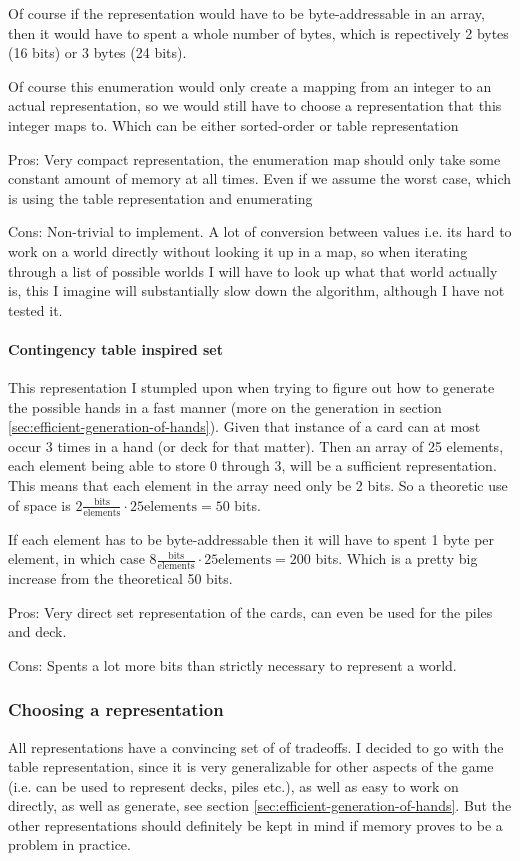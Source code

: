Of course if the representation would have to be byte-addressable in an array, then it would have to spent a whole number of bytes, which is repectively 2 bytes (16 bits) or 3 bytes (24 bits).

Of course this enumeration would only create a mapping from an integer to an actual representation, so we would still have to choose a representation that this integer maps to. Which can be either sorted-order or table representation

Pros: Very compact representation, the enumeration map should only take some constant amount of memory at all times. Even if we assume the worst case, which is using the table representation and enumerating

Cons: Non-trivial to implement. A lot of conversion between values i.e. its hard to work on a world directly without looking it up in a map, so when iterating through a list of possible worlds I will have to look up what that world actually is, this I imagine will substantially slow down the algorithm, although I have not tested it.

\paragraph{Contingency table inspired set}
This representation I stumpled upon when trying to figure out how to generate the possible hands in a fast manner (more on the generation in section \ref{sec:efficient-generation-of-hands}).
Given that instance of a card can at most occur 3 times in a hand (or deck for that matter). Then an array of 25 elements, each element being able to store 0 through 3, will be a sufficient representation. This means that each element in the array need only be 2 bits. So a theoretic use of space is $2 \frac{\text{bits}}{\text{elements}} \cdot 25\text{elements} = 50$ bits. 

If each element has to be byte-addressable then it will have to spent 1 byte per element, in which case $8 \frac{\text{bits}}{\text{elements}} \cdot 25\text{elements} = 200$ bits. Which is a pretty big increase from the theoretical 50 bits.  

Pros: Very direct set representation of the cards, can even be used for the piles and deck. 

Cons: Spents a lot more bits than strictly necessary to represent a world.


\subsubsection{Choosing a representation}
All representations have a convincing set of of tradeoffs. I decided to go with the table representation, since it is very generalizable for other aspects of the game (i.e. can be used to represent decks, piles etc.), as well as easy to work on directly, as well as generate, see section \ref{sec:efficient-generation-of-hands}. 
But the other representations should definitely be kept in mind if memory proves to be a problem in practice.


